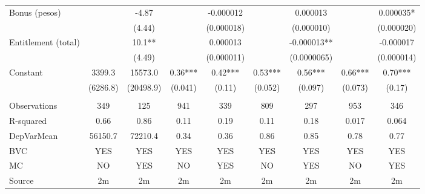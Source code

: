 \begin{tabular}{lcccccccc}
Bonus (pesos) &       & -4.87 &       & -0.000012 &       & 0.000013 &       & 0.000035* \\
      &       & (4.44) &       & (0.000018) &       & (0.000010) &       & (0.000020) \\
Entitlement (total) &       & 10.1** &       & 0.000013 &       & -0.000013** &       & -0.000017 \\
      &       & (4.49) &       & (0.000011) &       & (0.0000065) &       & (0.000014) \\
Constant & 3399.3 & 15573.0 & 0.36*** & 0.42*** & 0.53*** & 0.56*** & 0.66*** & 0.70*** \\
      & (6286.8) & (20498.9) & (0.041) & (0.11) & (0.052) & (0.097) & (0.073) & (0.17) \\
      &       &       &       &       &       &       &       &  \\
\midrule
Observations & 349   & 125   & 941   & 339   & 809   & 297   & 953   & 346 \\
R-squared & 0.66  & 0.86  & 0.11  & 0.19  & 0.11  & 0.18  & 0.017 & 0.064 \\
DepVarMean & 56150.7 & 72210.4 & 0.34  & 0.36  & 0.86  & 0.85  & 0.78  & 0.77 \\
BVC   & YES   & YES   & YES   & YES   & YES   & YES   & YES   & YES \\
MC    & NO    & YES   & NO    & YES   & NO    & YES   & NO    & YES \\
Source & 2m    & 2m    & 2m    & 2m    & 2m    & 2m    & 2m    & 2m \\
\bottomrule
\bottomrule
\end{tabular}%
